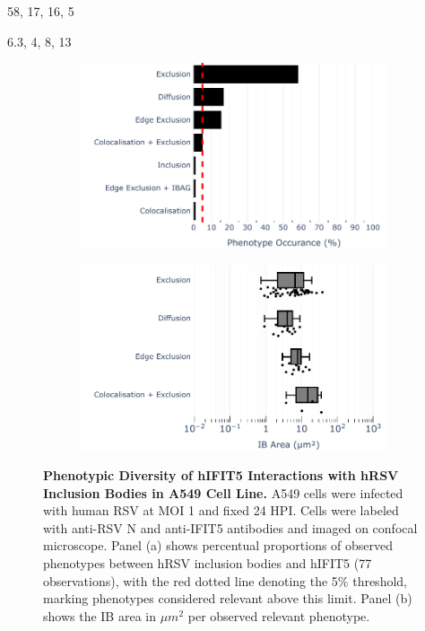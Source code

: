 58, 17, 16, 5

6.3, 4, 8, 13

\begin{figure}
    \begin{subfigure}{0.495\textwidth}
        \caption{}
        \includegraphics[width=1\linewidth]{08. Chapter 3/Figs/02. Infection/04. IFIT5/01. bar_i5_a549.pdf} 
    \end{subfigure}
    \begin{subfigure}{0.495\textwidth}
        \caption{}
        \includegraphics[width=1\linewidth]{08. Chapter 3/Figs/02. Infection/04. IFIT5/02. box_i5_a549.pdf}
    \end{subfigure}
    \caption[Phenotypic Diversity of hIFIT5 Interactions with hRSV Inclusion Bodies in A549 Cell Line.]{\textbf{Phenotypic Diversity of hIFIT5 Interactions with hRSV Inclusion Bodies in A549 Cell Line.} A549 cells were infected with human RSV at MOI 1 and fixed 24 HPI. Cells were labeled with anti-RSV N and anti-IFIT5 antibodies and imaged on confocal microscope. Panel (a) shows percentual proportions of observed phenotypes between hRSV inclusion bodies and hIFIT5 (77 observations), with the red dotted line denoting the 5\% threshold, marking phenotypes considered relevant above this limit. Panel (b) shows the IB area in \(\mu m^2\) per observed relevant phenotype.}
    \label{fig:Phenotypic Diversity of hIFIT5 Interactions with hRSV Inclusion Bodies in A549 Cell Line}
\end{figure}

